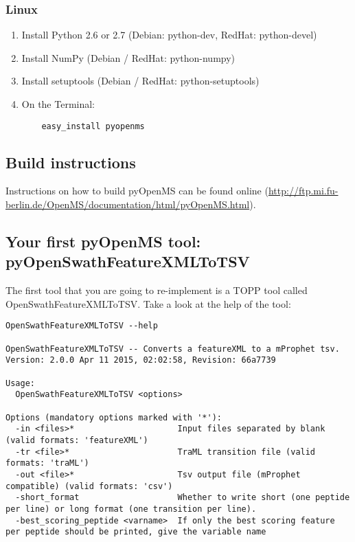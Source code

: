 {\subsubsection{Linux}
\begin{enumerate}
  \item Install Python 2.6 or 2.7 (Debian: python-dev, RedHat: python-devel)
  \item Install NumPy (Debian / RedHat: python-numpy)
  \item Install setuptools (Debian / RedHat: python-setuptools)
  \item On the Terminal:
    \begin{lstlisting}
    easy_install pyopenms
    \end{lstlisting}
\end{enumerate}

\subsection{Build instructions}
Instructions on how to build pyOpenMS can be found online (\url{http://ftp.mi.fu-berlin.de/OpenMS/documentation/html/pyOpenMS.html}).

\subsection{Your first pyOpenMS tool: pyOpenSwathFeatureXMLToTSV}
The first tool that you are going to re-implement is a TOPP tool called OpenSwathFeatureXMLToTSV. Take a look at the help of the tool:

\begin{lstlisting}
OpenSwathFeatureXMLToTSV --help

OpenSwathFeatureXMLToTSV -- Converts a featureXML to a mProphet tsv.
Version: 2.0.0 Apr 11 2015, 02:02:58, Revision: 66a7739

Usage:
  OpenSwathFeatureXMLToTSV <options>

Options (mandatory options marked with '*'):
  -in <files>*                     Input files separated by blank (valid formats: 'featureXML')
  -tr <file>*                      TraML transition file (valid formats: 'traML')
  -out <file>*                     Tsv output file (mProphet compatible) (valid formats: 'csv')
  -short_format                    Whether to write short (one peptide per line) or long format (one transition per line).
  -best_scoring_peptide <varname>  If only the best scoring feature per peptide should be printed, give the variable name
                                   

\end{lstlisting}}
